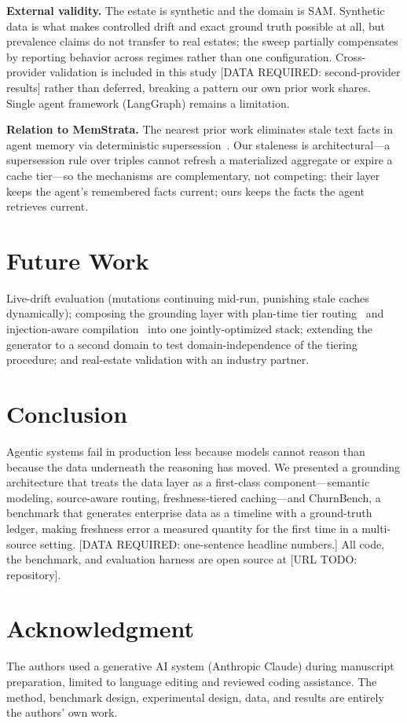 \documentclass{ieeeaccess}
\begin{document}
\textbf{External validity.} The estate is synthetic and the domain is SAM.
Synthetic data is what makes controlled drift and exact ground truth possible
at all, but prevalence claims do not transfer to real estates; the sweep
partially compensates by reporting behavior across regimes rather than one
configuration. Cross-provider validation is included in this study
[DATA REQUIRED: second-provider results] rather than deferred, breaking a
pattern our own prior work shares. Single agent framework (LangGraph) remains
a limitation.

\textbf{Relation to MemStrata.} The nearest prior work eliminates stale text
facts in agent memory via deterministic supersession~\cite{memstrata}. Our
staleness is architectural---a supersession rule over triples cannot refresh
a materialized aggregate or expire a cache tier---so the mechanisms are
complementary, not competing: their layer keeps the agent's remembered facts
current; ours keeps the facts the agent retrieves current.

\section{Future Work}
Live-drift evaluation (mutations continuing mid-run, punishing stale caches
dynamically); composing the grounding layer with plan-time tier
routing~\cite{par} and injection-aware compilation~\cite{tca} into one
jointly-optimized stack; extending the generator to a second domain to test
domain-independence of the tiering procedure; and real-estate validation with
an industry partner.

\section{Conclusion}
Agentic systems fail in production less because models cannot reason than
because the data underneath the reasoning has moved. We presented a grounding
architecture that treats the data layer as a first-class component---semantic
modeling, source-aware routing, freshness-tiered caching---and ChurnBench, a
benchmark that generates enterprise data as a timeline with a ground-truth
ledger, making freshness error a measured quantity for the first time in a
multi-source setting. [DATA REQUIRED: one-sentence headline numbers.] All
code, the benchmark, and evaluation harness are open source at
[URL TODO: repository].

\section*{Acknowledgment}
The authors used a generative AI system (Anthropic Claude) during manuscript
preparation, limited to language editing and reviewed coding assistance. The
method, benchmark design, experimental design, data, and results are entirely
the authors' own work.
\end{document}
